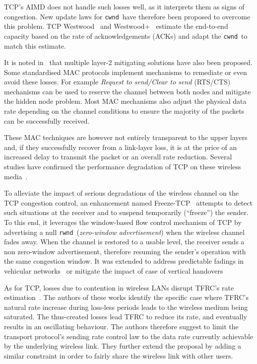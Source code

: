 \documentclass[twocolumn]{nictatechreport}
\newcommand{\sysvar}[1]{\texttt{#1}}
\newcommand{\rwnd}{\sysvar{rwnd}}
\newcommand{\cwnd}{\sysvar{cwnd}}
\begin{document}
TCP's AIMD does not handle such losses well, as it interprets them as signs of
congestion.  New update laws for \cwnd\ have therefore been proposed to overcome
this problem. TCP Westwood~\cite{2001mascolo_westwood} and
Westwood+~\cite{2004grieco_westwood-plus_comparison} estimate the end-to-end
capacity  based on the rate of acknowledgements (ACKs) and adapt the \cwnd\ to
match this estimate.

It is noted in~\cite{1997balakrishnan_comparison_improvements_tcp_wireless} that
multiple layer-2 mitigating solutions have also been proposed. Some standardised
MAC protocols implement mechanisms to remediate or even avoid these losses.  For
example \emph{Request to send/Clear to
send} (RTS/CTS) mechanisms can be used to reserve the channel between both
nodes and mitigate the hidden node problem.  Most MAC mechanisms also adjust the
physical data rate depending on the channel conditions to ensure the majority of
the packets can be successfully received.

These MAC techniques are however not entirely transparent to the upper layers
and, if they successfully recover from a link-layer loss, it is at the price of
an increased delay to transmit the packet or an overall rate reduction. Several
studies have confirmed the performance degradation of TCP on these wireless
media~\cite{2001xylomenos_tcp_issues_wireless,2003pilosof_tcp_fairness_wlan,2004benekos_tcp_measurements_802.11b,2005franceschinis_tcp_wifi_measurement}.

To alleviate the impact of serious degradations of the wireless channel on the
TCP congestion control, an enhancement named
Freeze-TCP~\cite{2000goff_freezetcp} attempts to detect such situations at the
receiver and to suspend temporarily (``freeze'') the sender. To this end, it
leverages the window-based flow control mechanism of TCP by advertising a null
\rwnd\ (\emph{zero-window advertisement}) when the wireless channel fades away.
When the channel is restored to a usable level, the receiver sends a non
zero-window advertisement, therefore resuming the sender's operation with the
same congestion window.  It was extended to address predictable fadings in
vehicular networks~\cite{2006baig_freezetcp_on-board_performance} or mitigate
the impact of case of vertical handovers~\cite{2009park_freezetcpv2}

As for TCP, losses due to contention in wireless LANs disrupt TFRC's rate
estimation~\cite{2008zhang_cross-layer_congestion-control_wlans}.
The authors of these works identify the specific case where TFRC's natural rate
increase during loss-less periods leads to the wireless medium being saturated.
The thus-created losses lead TFRC to reduce its rate, and eventually results in
an oscillating behaviour. The authors therefore suggest to limit the transport
protocol's sending rate control law to the data rate currently achievable by the
underlying wireless link. They further extend the proposal by adding a similar
constraint in order to fairly share the wireless link with other users.
\end{document}
